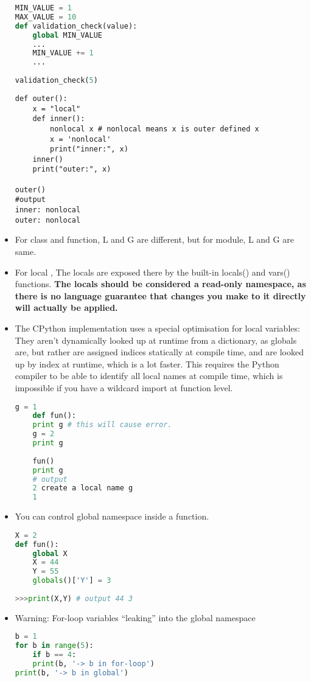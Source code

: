 \documentclass[a4paper,12pt,twoside]{book}
\begin{document}
\begin{itemize}
\begin{lstlisting}[frame=single, language=Python]
MIN_VALUE = 1
MAX_VALUE = 10
def validation_check(value):
	global MIN_VALUE
	...
	MIN_VALUE += 1
	...
	
validation_check(5)
\end{lstlisting} 

\begin{lstlisting}
def outer():
	x = "local"
	def inner():
		nonlocal x # nonlocal means x is outer defined x
		x = 'nonlocal'
		print("inner:", x)
	inner()
	print("outer:", x)
	
outer()
#output
inner: nonlocal
outer: nonlocal
\end{lstlisting}
	
	\item For class and function, L and G are different, but for module, L and G are same.
	\item For local , The locals are exposed there by the built-in locals() and vars() functions. \textbf{The locals should be considered a read-only namespace, as there is no language guarantee that changes you make to it directly will actually be applied.}
		\item The CPython implementation uses a special optimisation for local variables: They aren't dynamically looked up at runtime from a dictionary, as globals are, but rather are assigned indices statically at compile time, and are looked up by index at runtime, which is a lot faster. This requires the Python compiler to be able to identify all local names at compile time, which is impossible if you have a wildcard import at function level.
	\begin{lstlisting}[frame=single, language=Python]
	g = 1
	def fun():
	print g # this will cause error. 
	g = 2
	print g
	
	fun()
	print g
	# output 
	2 create a local name g
	1
	\end{lstlisting}  
	\item You can control global namespace inside a function.
\begin{lstlisting}[frame=single, language=Python]
X = 2
def fun():
	global X
	X = 44
	Y = 55
	globals()['Y'] = 3
	
>>>print(X,Y) # output 44 3
\end{lstlisting}  

\item Warning: For-loop variables “leaking” into the global namespace
\begin{lstlisting}[frame=single, language=Python]
b = 1
for b in range(5):
	if b == 4:
	print(b, '-> b in for-loop')
print(b, '-> b in global')


\end{lstlisting}
\end{itemize}
\end{document}
